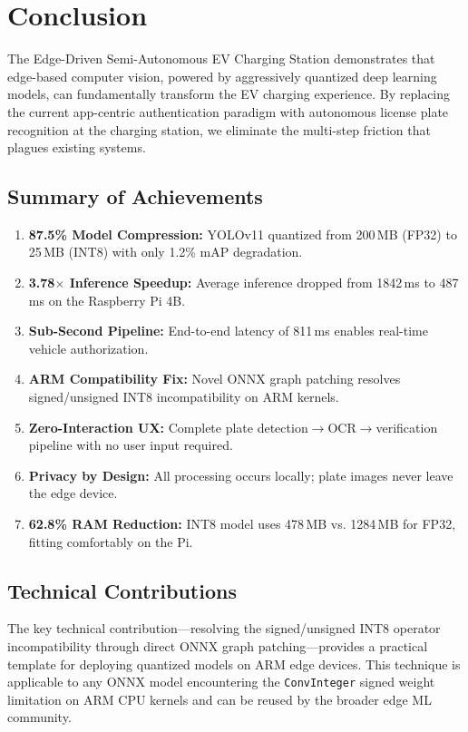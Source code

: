 \documentclass[11pt]{report}
\begin{document}
\chapter{Conclusion}

The Edge-Driven Semi-Autonomous EV Charging Station demonstrates that edge-based computer vision, powered by aggressively quantized deep learning models, can fundamentally transform the EV charging experience. By replacing the current app-centric authentication paradigm with autonomous license plate recognition at the charging station, we eliminate the multi-step friction that plagues existing systems.

\section{Summary of Achievements}
\begin{enumerate}
    \item \textbf{87.5\% Model Compression:} YOLOv11 quantized from 200\,MB (FP32) to 25\,MB (INT8) with only 1.2\% mAP degradation.
    \item \textbf{3.78$\times$ Inference Speedup:} Average inference dropped from 1842\,ms to 487\,ms on the Raspberry Pi 4B.
    \item \textbf{Sub-Second Pipeline:} End-to-end latency of 811\,ms enables real-time vehicle authorization.
    \item \textbf{ARM Compatibility Fix:} Novel ONNX graph patching resolves signed/unsigned INT8 incompatibility on ARM kernels.
    \item \textbf{Zero-Interaction UX:} Complete plate detection$\to$OCR$\to$verification pipeline with no user input required.
    \item \textbf{Privacy by Design:} All processing occurs locally; plate images never leave the edge device.
    \item \textbf{62.8\% RAM Reduction:} INT8 model uses 478\,MB vs. 1284\,MB for FP32, fitting comfortably on the Pi.
\end{enumerate}

\section{Technical Contributions}
The key technical contribution---resolving the signed/unsigned INT8 operator incompatibility through direct ONNX graph patching---provides a practical template for deploying quantized models on ARM edge devices. This technique is applicable to any ONNX model encountering the \texttt{ConvInteger} signed weight limitation on ARM CPU kernels and can be reused by the broader edge ML community.
\end{document}
